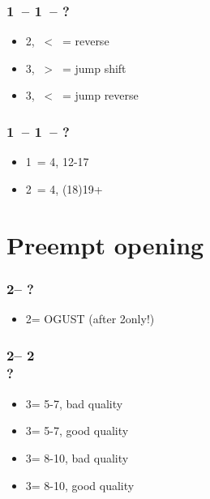 \subsubsection*{1\ -- 1\ -- ?}
\begin{itemize}
    \item 2, \ < \ = reverse
    \item 3, \ > \ = jump shift
    \item 3, \ < \ = jump reverse
\end{itemize}

\subsubsection*{1\mins\ -- 1\hearts\ -- ?}
\begin{itemize}
    \item 1\spades\ = 4\spades, 12-17
    \item 2\spades\ = 4\spades, (18)19+
\end{itemize}

\section{\texorpdfstring{Preempt opening}{preemptOpening}}\label{sec:preemptOpening}

\subsubsection*{2\diams -- ?}
\begin{itemize}
    \item 2\nt = OGUST (after 2\diams only!)
\end{itemize}

\subsubsection*{2\diams -- 2\diams \\ ?}
\begin{itemize}
    \item 3\clubs = 5-7, bad \diams quality
    \item 3\diams = 5-7, good \diams quality
    \item 3\hearts = 8-10, bad \diams quality
    \item 3\spades = 8-10, good \diams quality
\end{itemize}

